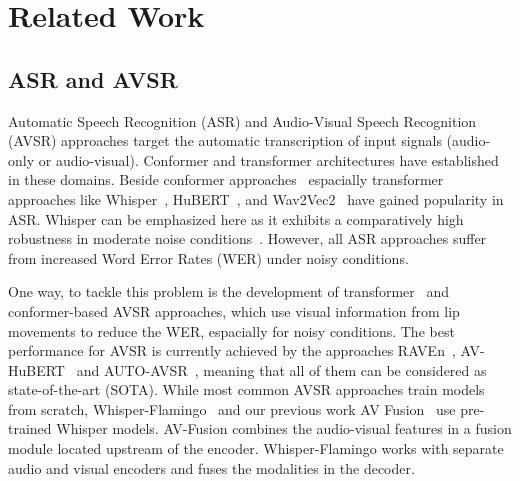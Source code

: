 \section{Related Work}

\subsection{ASR and AVSR}

Automatic Speech Recognition (ASR) and Audio-Visual Speech Recognition (AVSR) approaches target the automatic transcription of input signals (audio-only or audio-visual).
Conformer and transformer architectures have established in these domains.
Beside conformer approaches~\cite{ASR_conformer_2020,ASR_conformer2_2022} espacially transformer approaches like Whisper~\cite{ASR_whisper_2022}, HuBERT~\cite{ASR_HuBERT_2021}, and Wav2Vec2~\cite{ASR_wav2vec_2020} have gained popularity in ASR. Whisper can be emphasized here as it exhibits a comparatively high robustness in moderate noise conditions~\cite{ASR_whisperAT_2023}. However, all ASR approaches suffer from increased Word Error Rates (WER) under noisy conditions.

One way, to tackle this problem is the development of transformer~\cite{AVSR_avhubert_2022, AVSR_robust_ssAVSR_avhubert2_2022, AVSR_jointly_rawD_2022, AVSR_AV_FTof_aOnlyASR} and conformer-based\cite{AVSR_autoAVSR_2023, AVSR_e2e_conformer,AVSR_AVFormer} AVSR approaches, which use visual information from lip movements to reduce the WER, espacially for noisy conditions.
The best performance for AVSR is currently achieved by the approaches RAVEn~\cite{AVSR_jointly_rawD_2022}, AV-HuBERT~\cite{AVSR_robust_ssAVSR_avhubert2_2022} and AUTO-AVSR~\cite{AVSR_autoAVSR_2023}, meaning that all of them can be considered as state-of-the-art (SOTA). 
While most common AVSR approaches train models from scratch, Whisper-Flamingo~\cite{AVSR_2024__WhisperFlamingo} and our previous work AV Fusion~\cite{AVSR_2023_selfsupervised} use pre-trained Whisper models. AV-Fusion combines the audio-visual features in a fusion module located upstream of the encoder. Whisper-Flamingo works with separate audio and visual encoders and fuses the modalities in the decoder.




